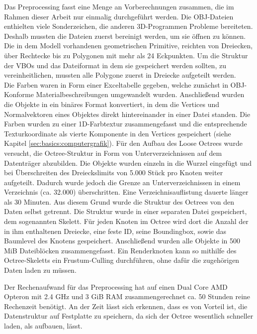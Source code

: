 Das Preprocessing fasst eine Menge an Vorberechnungen zusammen, die im Rahmen dieser Arbeit nur einmalig durchgeführt werden. Die OBJ-Dateien enthielten viele Sonderzeichen, die anderen 3D-Programmen Probleme bereiteten. Deshalb mussten die Dateien zuerst bereinigt werden, um sie öffnen zu können. Die in dem Modell vorhandenen geometrischen Primitive, reichten von Dreiecken, über Rechtecke bis zu Polygonen mit mehr als 24 Eckpunkten. Um die Struktur der VBOs und das Dateiformat in dem sie gespeichert werden sollten, zu vereinheitlichen, mussten alle Polygone zuerst in Dreiecke aufgeteilt werden. \\
Die Farben waren in Form einer Exceltabelle gegeben, welche zunächst in OBJ-Konforme Materialbeschreibungen umgewandelt wurden. Anschließend wurden die Objekte in ein binäres Format konvertiert, in dem die Vertices und Normalvektoren eines Objektes direkt hintereinander in einer Datei standen. Die Farben wurden zu einer 1D-Farbtextur zusammengefasst und die entsprechende Texturkoordinate als vierte Komponente in den Vertices gespeichert (siehe Kapitel \ref{sec:basics:computergrafik}). Für den Aufbau des Loose Octrees wurde versucht, die Octree-Struktur in Form von Unterverzeichnissen auf dem Datenträger abzubilden. Die Objekte wurden einzeln in die Wurzel eingefügt und bei Überschreiten des Dreieckslimits von 5.000 Stück pro Knoten weiter aufgeteilt. Dadurch wurde jedoch die Grenze an Unterverzeichnissen in einem Verzeichnis (ca. 32.000) überschritten. Eine Verzeichnisauflistung dauerte länger als 30 Minuten. Aus diesem Grund wurde die Struktur des Octrees von den Daten selbst getrennt. Die Struktur wurde in einer separaten Datei gespeichert, dem sogenannten Skelett. Für jeden Knoten im Octree wird dort die Anzahl der in ihm enthaltenen Dreiecke, eine feste ID, seine Boundingbox, sowie das Baumlevel des Knotens gespeichert. Anschließend wurden alle Objekte in 500 MiB Dateiblöcken zusammengefasst. Ein Renderknoten kann so mithilfe des Octree-Skeletts ein Frustum-Culling durchführen, ohne dafür die zugehörigen Daten laden zu müssen.

Der Rechenaufwand für das Preprocessing hat auf einen Dual Core AMD Opteron mit 2.4 GHz und 3 GiB RAM zusammengerechnet ca. 50 Stunden reine Rechenzeit benötigt. An der Zeit lässt sich erkennen, dass es von Vorteil ist, die Datenstruktur auf Festplatte zu speichern, da sich der Octree wesentlich schneller laden, als aufbauen, lässt.


